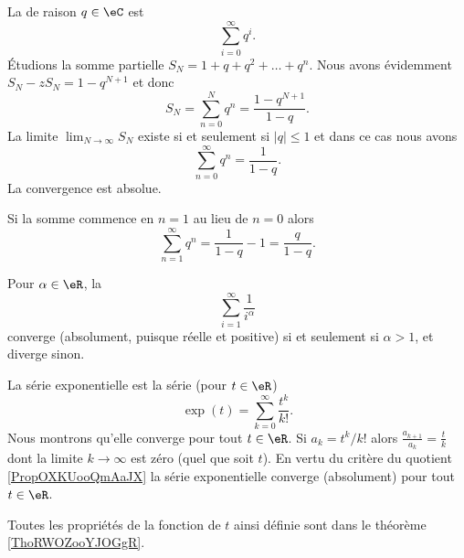 \begin{example} \label{ExZMhWtJS}
    La  de raison $q \in \eC$ est
    \begin{equation}    \label{EqZQTGooIWEFxL}
        \sum_{i=0}^\infty q^i.
    \end{equation}
    Étudions la somme partielle \( S_N=1+q+q^2+\ldots +q^{n}\). Nous avons évidemment $S_N-zS_N=1-q^{N+1}$ et donc
    \begin{equation}    \label{EqASYTiCK}
        S_N=\sum_{n=0}^Nq^n=\frac{ 1-q^{N+1} }{ 1-q }.
    \end{equation}
    La limite \( \lim_{N\to \infty} S_N\) existe si et seulement si \( | q |\leq 1\) et dans ce cas nous avons
    \begin{equation}    \label{EqRGkBhrX}
        \sum_{n=0}^{\infty}q^n=\frac{ 1 }{ 1-q }.
    \end{equation}
    La convergence est absolue.

    Si la somme commence en \( n=1\) au lieu de \( n=0\) alors
    \begin{equation}        \label{EqPZOWooMdSRvY}
        \sum_{n=1}^{\infty}q^n=\frac{1}{ 1-q }-1=\frac{ q }{ 1-q }.
    \end{equation}
\end{example}

\begin{example}
    Pour $\alpha \in \eR$, la 
    \begin{equation}        \label{EqSerRiem}
        \sum_{i=1}^\infty \frac1{i^\alpha}
    \end{equation}
    converge (absolument, puisque réelle et positive) si et seulement si $\alpha > 1$, et diverge sinon.
\end{example}

\begin{example} \label{ExIJMHooOEUKfj}
    La série exponentielle est la série (pour \( t\in \eR\))
    \begin{equation}
        \exp(t)=\sum_{k=0}^{\infty}\frac{ t^k }{ k! }.
    \end{equation}
    Nous montrons qu'elle converge pour tout \( t\in \eR\). Si \( a_k=t^k/k!\) alors \( \frac{ a_{k+1} }{ a_k }=\frac{ t }{ k }\) dont la limite \( k\to \infty\) est zéro (quel que soit \( t\)). En vertu du critère du quotient \ref{PropOXKUooQmAaJX} la série exponentielle converge (absolument) pour tout \( t\in \eR\).

    Toutes les propriétés de la fonction de \( t\) ainsi définie sont dans le théorème \ref{ThoRWOZooYJOGgR}.
\end{example}

